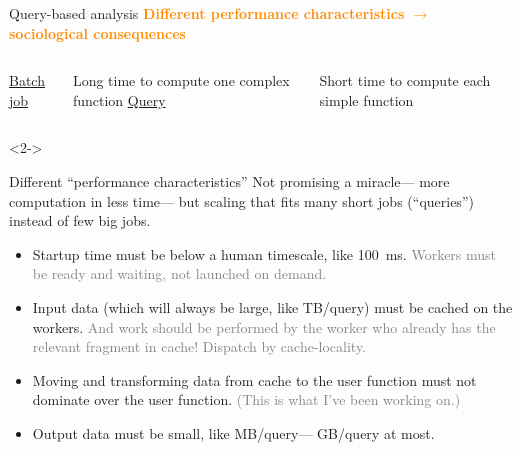 \documentclass[aspectratio=169]{beamer}
\begin{document}
\begin{frame}{Query-based analysis}
\large
\vspace{0.5 cm}
\textcolor{darkorange}{\bf Different performance characteristics $\to$ sociological consequences}

\vspace{1 cm}
\begin{columns}
\underline{\Large Batch job}

\vspace{0.2 cm}
Long time to compute one complex function
\underline{\Large Query}

\vspace{0.2 cm}
Short time to compute each simple function
\end{columns}

\vspace{1 cm}
\begin{uncoverenv}<2->
 \hfill {}
\end{uncoverenv}
\end{frame}

\begin{frame}{Different ``performance characteristics''}
\large
\vspace{0.5 cm}
Not promising a miracle--- more computation in less time--- but scaling that fits many short jobs (``queries'') instead of few big jobs.

\vspace{0.5 cm}

\vspace{0.2 cm}
\begin{itemize}
\item<3-> Startup time must be below a human timescale, like 100~ms. \textcolor{gray}{Workers must be ready and waiting, not launched on demand.}
\item<4-> Input data (which will always be large, like TB/query) must be cached on the workers. \textcolor{gray}{And work should be performed by the worker who already has the relevant fragment in cache! Dispatch by cache-locality.}
\item<5-> Moving and transforming data from cache to the user function must not dominate over the user function. \textcolor{gray}{(This is what I've been working on.)}
\item<6-> Output data must be small, like MB/query--- GB/query at most.
\end{itemize}
\end{frame}
\end{document}
